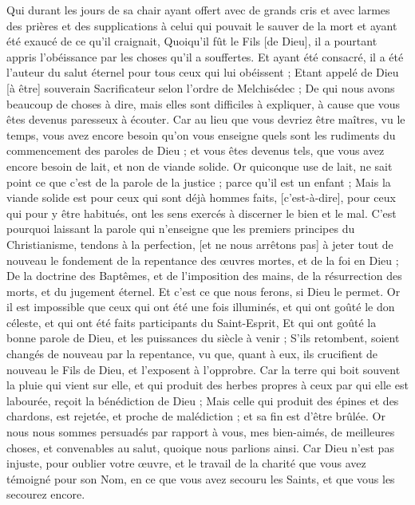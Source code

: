\begin{multicols}{2}
Qui durant les jours de sa chair ayant offert avec de grands cris et avec larmes des prières et des supplications à celui qui pouvait le sauver de la mort et ayant été exaucé de ce qu'il craignait,
Quoiqu'il fût le Fils [de Dieu], il a pourtant appris l'obéissance par les choses qu'il a souffertes.
Et ayant été consacré, il a été l'auteur du salut éternel pour tous ceux qui lui obéissent ;
Etant appelé de Dieu [à être] souverain Sacrificateur selon l'ordre de Melchisédec ;
De qui nous avons beaucoup de choses à dire, mais elles sont difficiles à expliquer, à cause que vous êtes devenus paresseux à écouter.
Car au lieu que vous devriez être maîtres, vu le temps, vous avez encore besoin qu'on vous enseigne quels sont les rudiments du commencement des paroles de Dieu ; et vous êtes devenus tels, que vous avez encore besoin de lait, et non de viande solide.
Or quiconque use de lait, ne sait point ce que c'est de la parole de la justice ; parce qu'il est un enfant ;
Mais la viande solide est pour ceux qui sont déjà hommes faits, [c'est-à-dire], pour ceux qui pour y être habitués, ont les sens exercés à discerner le bien et le mal.
\VerseOne{}C'est pourquoi laissant la parole qui n'enseigne que les premiers principes du Christianisme, tendons à la perfection, [et ne nous arrêtons pas] à jeter tout de nouveau le fondement de la repentance des œuvres mortes, et de la foi en Dieu ;
De la doctrine des Baptêmes, et de l'imposition des mains, de la résurrection des morts, et du jugement éternel.
Et c'est ce que nous ferons, si Dieu le permet.
Or il est impossible que ceux qui ont été une fois illuminés, et qui ont goûté le don céleste, et qui ont été faits participants du Saint-Esprit,
Et qui ont goûté la bonne parole de Dieu, et les puissances du siècle à venir ;
S'ils retombent, soient changés de nouveau par la repentance, vu que, quant à eux, ils crucifient de nouveau le Fils de Dieu, et l'exposent à l'opprobre.
Car la terre qui boit souvent la pluie qui vient sur elle, et qui produit des herbes propres à ceux par qui elle est labourée, reçoit la bénédiction de Dieu ;
Mais celle qui produit des épines et des chardons, est rejetée, et proche de malédiction ; et sa fin est d'être brûlée.
Or nous nous sommes persuadés par rapport à vous, mes bien-aimés, de meilleures choses, et convenables au salut, quoique nous parlions ainsi.
Car Dieu n'est pas injuste, pour oublier votre œuvre, et le travail de la charité que vous avez témoigné pour son Nom, en ce que vous avez secouru les Saints, et que vous les secourez encore.

\end{multicols}
